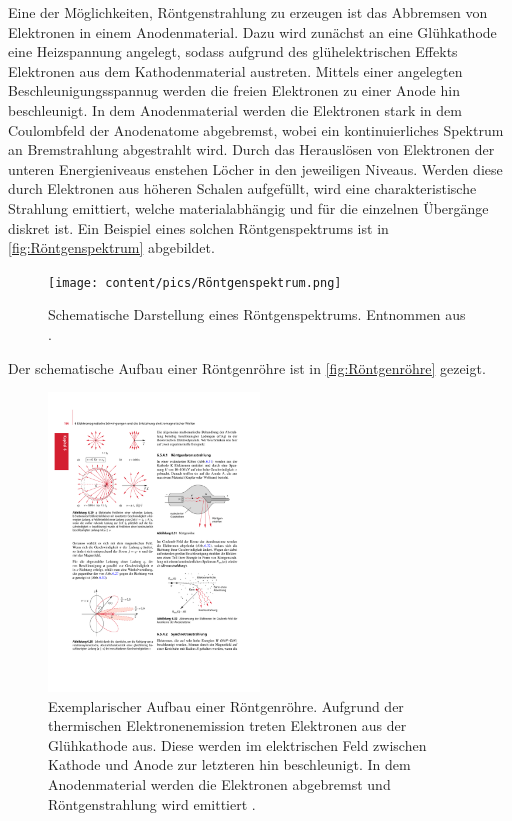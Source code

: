 Eine der Möglichkeiten, Röntgenstrahlung zu erzeugen ist das Abbremsen von Elektronen in einem Anodenmaterial.
Dazu wird zunächst an eine Glühkathode eine Heizspannung angelegt, sodass aufgrund des glühelektrischen Effekts Elektronen aus dem Kathodenmaterial austreten.
Mittels einer angelegten Beschleunigungsspannug werden die freien Elektronen zu einer Anode hin beschleunigt. In dem Anodenmaterial werden die Elektronen stark in
dem Coulombfeld der Anodenatome abgebremst, wobei ein kontinuierliches Spektrum an Bremstrahlung abgestrahlt wird. 
Durch das Herauslösen von Elektronen der unteren Energieniveaus enstehen Löcher in den jeweiligen Niveaus. Werden diese durch Elektronen aus höheren Schalen aufgefüllt,
wird eine charakteristische Strahlung emittiert, welche materialabhängig und für die einzelnen Übergänge diskret ist. 
Ein Beispiel eines solchen Röntgenspektrums ist in \autoref{fig:Röntgenspektrum} abgebildet.
\begin{figure}
    \centering
    \texttt{[image: content/pics/Röntgenspektrum.png]}
    \caption{Schematische Darstellung eines Röntgenspektrums. Entnommen aus \cite{VROE}.}
    \label{fig:Röntgenspektrum}
\end{figure}
Der schematische Aufbau einer Röntgenröhre ist in \autoref{fig:Röntgenröhre} gezeigt.
\begin{figure}
    \centering
    \includegraphics[width=0.5\textwidth]{content/pics/Röntgenröhre.pdf}
    \caption{Exemplarischer Aufbau einer Röntgenröhre. Aufgrund der thermischen Elektronenemission treten Elektronen aus der Glühkathode aus. %
    Diese werden im elektrischen Feld zwischen Kathode und Anode zur letzteren hin beschleunigt. In dem Anodenmaterial werden die Elektronen abgebremst und %
    Röntgenstrahlung wird emittiert \cite{Demtröder2}.}
    \label{fig:Röntgenröhre}
\end{figure}


